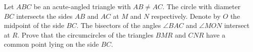 Let $ABC$ be an acute-angled triangle with $AB\neq AC$.
The circle with diameter $BC$ intersects the sides $AB$ and $AC$
at $M$ and $N$ respectively.
Denote by $O$ the midpoint of the side $BC$.
The bisectors of the angles $\angle BAC$ and $\angle MON$ intersect at $R$.
Prove that the circumcircles of the triangles $BMR$ and $CNR$
have a common point lying on the side $BC$.